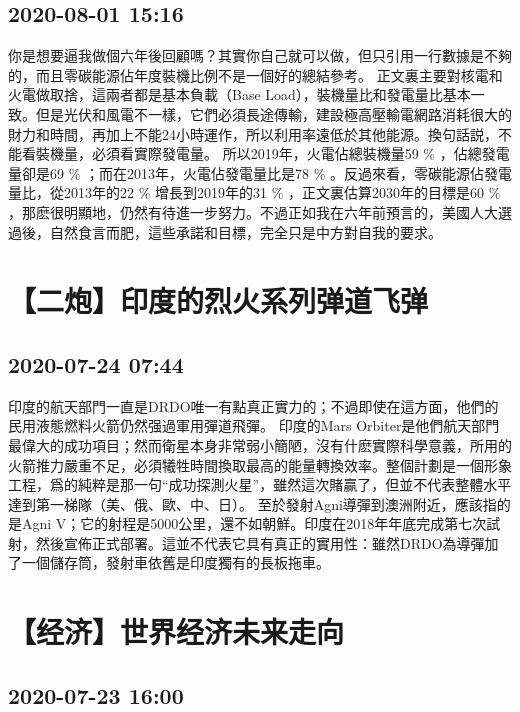 \documentclass[twocolumn]{ctexart}
\begin{document}
\subsection*{2020-08-01 15:16}

你是想要逼我做個六年後回顧嗎？其實你自己就可以做，但只引用一行數據是不夠的，而且零碳能源佔年度裝機比例不是一個好的總結參考。
正文裏主要對核電和火電做取捨，這兩者都是基本負載（Base Load），裝機量比和發電量比基本一致。但是光伏和風電不一樣，它們必須長途傳輸，建設極高壓輸電網路消耗很大的財力和時間，再加上不能24小時運作，所以利用率遠低於其他能源。換句話説，不能看裝機量，必須看實際發電量。
所以2019年，火電佔總裝機量59 \% ，佔總發電量卻是69 \% ；而在2013年，火電佔發電量比是78 \% 。反過來看，零碳能源佔發電量比，從2013年的22 \% 增長到2019年的31 \% ，正文裏估算2030年的目標是60 \% ，那麽很明顯地，仍然有待進一步努力。不過正如我在六年前預言的，美國人大選過後，自然食言而肥，這些承諾和目標，完全只是中方對自我的要求。
\section*{【二炮】印度的烈火系列弹道飞弹}
\subsection*{2020-07-24 07:44}

印度的航天部門一直是DRDO唯一有點真正實力的；不過即使在這方面，他們的民用液態燃料火箭仍然强過軍用彈道飛彈。
印度的Mars Orbiter是他們航天部門最偉大的成功項目；然而衛星本身非常弱小簡陋，沒有什麽實際科學意義，所用的火箭推力嚴重不足，必須犧牲時間換取最高的能量轉換效率。整個計劃是一個形象工程，爲的純粹是那一句“成功探測火星”，雖然這次賭贏了，但並不代表整體水平達到第一梯隊（美、俄、歐、中、日）。
至於發射Agni導彈到澳洲附近，應該指的是Agni V；它的射程是5000公里，還不如朝鮮。印度在2018年年底完成第七次試射，然後宣佈正式部署。這並不代表它具有真正的實用性：雖然DRDO為導彈加了一個儲存筒，發射車依舊是印度獨有的長板拖車。
\section*{【经济】世界经济未来走向}
\subsection*{2020-07-23 16:00}
\end{document}
